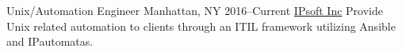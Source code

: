 \begin{cventries}
\cventry
    {Unix/Automation Engineer}
    {Manhattan, NY}
    {2016--Current}
    {\href{www.ipsoft.com}{IPsoft Inc}}
    {Provide Unix related automation to clients through an ITIL framework utilizing Ansible and IPautomatas.}

\end{cventries}



